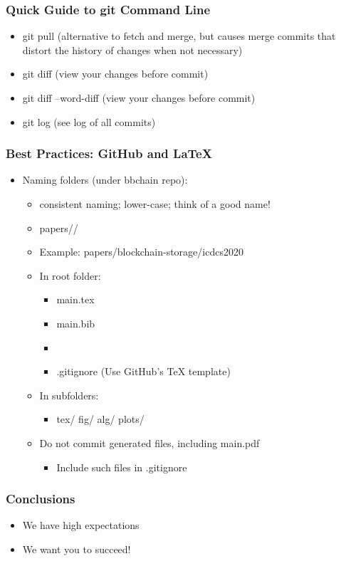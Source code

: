 \documentclass[hyperref={pdfpagelabels=false}, aspectratio=1610]{beamer}
\begin{document}
\begin{frame}
\frametitle{Quick Guide to git Command Line}
\begin{block}{}
 \begin{itemize}
  \item git pull \quad (alternative to fetch and merge, but causes merge commits that distort the history of changes when not necessary)
  \item git diff \quad (view your changes before commit)
  \item git diff --word-diff \quad (view your changes before commit)
  \item git log \quad (see log of all commits)
 \end{itemize}
\end{block}
\end{frame}

\begin{frame}
\frametitle{Best Practices: GitHub and LaTeX}
\begin{block}{}
 \begin{itemize}
  \item Naming folders (under bbchain repo):
  \begin{itemize}
  	\item consistent naming; lower-case; think of a good name!
	\item papers//
	\item Example: papers/blockchain-storage/icdcs2020
  \end{itemize}
  \begin{itemize}
  	\item In root folder:
	\begin{itemize}
		\item main.tex
		\item main.bib
		\item {}
		\item .gitignore \quad (Use GitHub's TeX template)
	\end{itemize}
	\item In subfolders:
	\begin{itemize}
		\item tex/ \quad fig/ \quad alg/ \quad plots/
	\end{itemize}
	\item Do not commit generated files, including main.pdf
	\begin{itemize}
		\item Include such files in .gitignore
	\end{itemize}
  \end{itemize}
  \end{itemize}
\end{block}
\end{frame}

\begin{frame}
\frametitle{Conclusions}
\begin{block}{}
 \begin{itemize}
  \item We have high expectations
  \item We want you to succeed!
 \end{itemize}
\end{block}
\end{frame}
\end{document}

